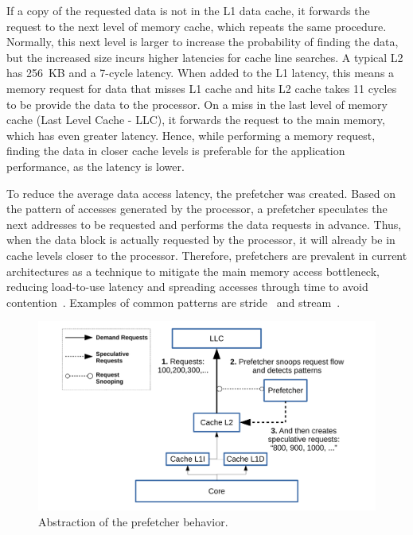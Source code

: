 \documentclass[AMA,final,STIX1COL]{WileyNJD-v2}
\begin{document}
If a copy of the requested data is not in the L1 data cache, it forwards the request to the next level of memory cache, which repeats the same procedure.
Normally, this next level is larger to increase the probability of finding the data, but the increased size incurs higher latencies for cache line searches.
A typical L2 has 256~KB and a 7-cycle latency.
When added to the L1 latency, this means a memory request for data that misses L1 cache and hits L2 cache takes 11 cycles to be provide the data to the processor.
On a miss in the last level of memory cache (Last Level Cache - LLC), it forwards the request to the main memory, which has even greater latency. 
Hence, while performing a memory request, finding the data in closer cache levels is preferable for the application performance, as the latency is lower.

To reduce the average data access latency, the prefetcher was created.
Based on the pattern of accesses generated by the processor, a prefetcher speculates the next addresses to be requested and performs the data requests in advance.
Thus, when the data block is actually requested by the processor, it will already be in cache levels closer to the processor.
Therefore, prefetchers are prevalent in current architectures as a technique to mitigate the main memory access bottleneck, reducing load-to-use latency and spreading accesses through time to avoid contention~\cite{bakhshalipour2019bingo}.
Examples of common patterns are stride~\cite{chen1995effective} and stream~\cite{le2007ibm}.

\begin{figure}[!htb]
    \centering
        \includegraphics[width=.7\textwidth]{figures/figpref-en.pdf}
  \caption{Abstraction of the prefetcher behavior.}
  \label{fig:prefetcher}
\end{figure}
\end{document}
